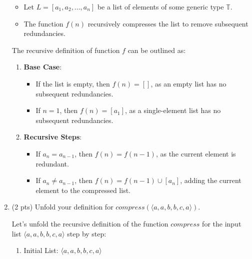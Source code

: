 \documentclass[12pt]{article}
\begin{document}
\begin{spacing}{1.5}
\begin{enumerate}
		      \begin{itemize}
		      	\item Let $L = [a_1, a_2, ..., a_n]$ be a list of elements of some generic type $\mathbb{T}$.
		      	      		      	      
		      	\item The function $f(n)$ recursively compresses the list to remove subsequent redundancies.
		      \end{itemize}
		      		      
		      The recursive definition of function $f$ can be outlined as: 
		      		      
		      \begin{enumerate}
		      	\item \textbf{Base Case}: 
		      	      \begin{itemize}
		      	      	\item If the list is empty, then $f(n) = []$, as an empty list has no subsequent redundancies.
		      	      	      		      	      	                          
		      	      	\item If $n = 1$, then $f(n) = [a_1]$, as a single-element list has no subsequent redundancies.
		      	      \end{itemize}
		      	      		      	      
		      	\item \textbf{Recursive Steps}:
		      	      \begin{itemize}
		      	      	\item If $a_n = a_{n-1}$, then $f(n) = f(n-1)$, as the current element is redundant.
		      	      	      		      	      	      
		      	      	\item If $a_n \neq a_{n-1}$, then $f(n) = f(n-1) \cup [a_n]$, adding the current element to the compressed list.
		      	      \end{itemize}
		      \end{enumerate}
		      		      
		\item (2 pts) Unfold your definition for $compress(\langle a, a, b, b, c, a \rangle)$.
		      		      
		      Let's unfold the recursive definition of the function $compress$ for the input list $\langle a, a, b, b, c, a \rangle$ step by step:
		      		      
		      \begin{enumerate}
		      	\item Initial List: $\langle a, a, b, b, c, a \rangle$
		      	      		      	      

\end{enumerate}
\end{enumerate}
\end{spacing}
\end{document}
